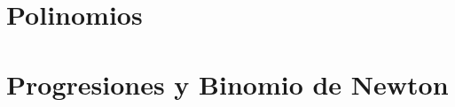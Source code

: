 \documentclass[12pt, a4paper, twoside]{book}
\begin{document}
\chapter{Polinomios}

% 
% 
% 

% 
% 
% 

% 
% 
% 

% 
% 
% 

% 
% 
% 

% 
% 
% 

% 
% 
% 

% 
% 
% 

\chapter{Progresiones y Binomio de Newton}

% 
% 
% 

% 
% 
% 
\end{document}
